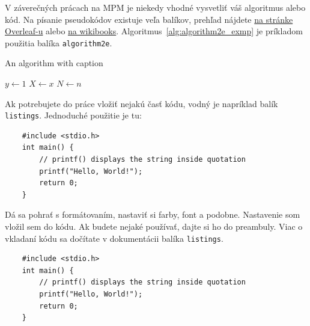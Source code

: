 V záverečných prácach na MPM je niekedy vhodné vysvetliť váš algoritmus alebo kód. Na písanie pseudokódov existuje veľa balíkov, prehľad nájdete \href{https://www.overleaf.com/learn/latex/Algorithms}{na stránke Overleaf-u} alebo \href{https://en.wikibooks.org/wiki/LaTeX/Algorithms#The_algorithm_environment}{na wikibooks}. Algoritmus~\ref{alg:algorithm2e_exmp} je príkladom použitia balíka \verb|algorithm2e|.

\begin{algorithm}[h!]
	\caption{An algorithm with caption}\label{alg:algorithm2e_exmp}
	$y \gets 1$\;
	$X \gets x$\;
	$N \gets n$\;
\end{algorithm}

Ak potrebujete do práce vložiť nejakú časť kódu, vodný je napríklad balík \verb|listings|. Jednoduché použitie je tu:
\begin{lstlisting}
	#include <stdio.h>
	int main() {
		// printf() displays the string inside quotation
		printf("Hello, World!");
		return 0;
	}
\end{lstlisting}

Dá sa pohrať s formátovaním, nastaviť si farby, font a podobne. Nastavenie som vložil sem do kódu. Ak budete nejaké používať, dajte si ho do preambuly. Viac o vkladaní kódu sa dočítate v dokumentácii balíka \verb|listings|.



\begin{lstlisting}
	#include <stdio.h>
	int main() {
		// printf() displays the string inside quotation
		printf("Hello, World!");
		return 0;
	}
\end{lstlisting}
